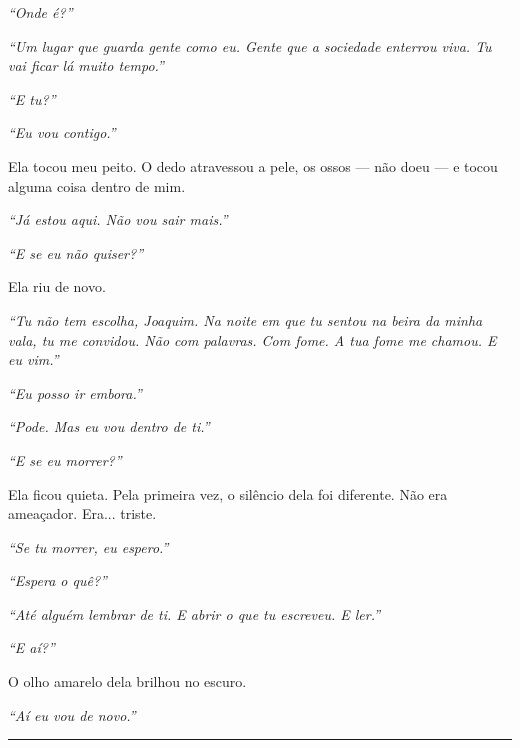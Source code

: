 \noindent \textit{\textquotedblleft{}Onde é?\textquotedblright{}}

\noindent \textit{\textquotedblleft{}Um lugar que guarda gente como eu. Gente que a sociedade enterrou viva. Tu vai ficar lá muito tempo.\textquotedblright{}}

\noindent \textit{\textquotedblleft{}E tu?\textquotedblright{}}

\noindent \textit{\textquotedblleft{}Eu vou contigo.\textquotedblright{}}

\noindent Ela tocou meu peito. O dedo atravessou a pele, os ossos --- não doeu --- e tocou alguma coisa dentro de mim.

\noindent \textit{\textquotedblleft{}Já estou aqui. Não vou sair mais.\textquotedblright{}}

\noindent \textit{\textquotedblleft{}E se eu não quiser?\textquotedblright{}}

\noindent Ela riu de novo.

\noindent \textit{\textquotedblleft{}Tu não tem escolha, Joaquim. Na noite em que tu sentou na beira da minha vala, tu me convidou. Não com palavras. Com fome. A tua fome me chamou. E eu vim.\textquotedblright{}}

\noindent \textit{\textquotedblleft{}Eu posso ir embora.\textquotedblright{}}

\noindent \textit{\textquotedblleft{}Pode. Mas eu vou dentro de ti.\textquotedblright{}}

\noindent \textit{\textquotedblleft{}E se eu morrer?\textquotedblright{}}

\noindent Ela ficou quieta. Pela primeira vez, o silêncio dela foi diferente. Não era ameaçador. Era... triste.

\noindent \textit{\textquotedblleft{}Se tu morrer, eu espero.\textquotedblright{}}

\noindent \textit{\textquotedblleft{}Espera o quê?\textquotedblright{}}

\noindent \textit{\textquotedblleft{}Até alguém lembrar de ti. E abrir o que tu escreveu. E ler.\textquotedblright{}}

\noindent \textit{\textquotedblleft{}E aí?\textquotedblright{}}

\noindent O olho amarelo dela brilhou no escuro.

\noindent \textit{\textquotedblleft{}Aí eu vou de novo.\textquotedblright{}}

\vspace{0.5em}\noindent\rule{\textwidth}{0.5pt}\vspace{0.5em}

